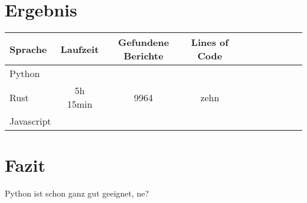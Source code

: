 \section{Ergebnis}

\begin{tabular}{| l | c | c | c | c | c | c | c | c | c | c |}
	\hline
	Sprache    & Laufzeit & Gefundene Berichte & Lines of Code\\
	\hline
	Python     & & &\\
	\hline
	Rust       & 5h 15min & 9964 & zehn\\
	\hline
	Javascript & & &\\
	\hline
\end{tabular}

\section{Fazit}
Python ist schon ganz gut geeignet, ne?\\